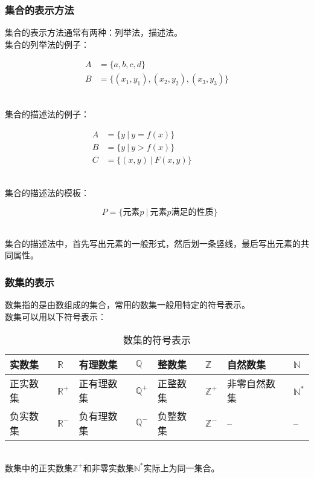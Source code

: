 \documentclass[UTF8]{ctexart}
\begin{document}
\subsubsection{集合的表示方法}
    集合的表示方法通常有两种：列举法，描述法。\\[3mm]
    集合的列举法的例子：
    \begin{large}
        \begin{align*}
            A&=\big\{ a,b,c,d\big\}\\[5mm]
            B&=\big\{ (x_1,y_1),(x_2,y_2),(x_3,y_3) \big\}
        \end{align*}
    \end{large}\\
    集合的描述法的例子：
    \begin{large}
        \begin{align*}
            A&=\big\{ y~|~y=f(x)\big\}\\[5mm]
            B&=\big\{ y~|~y>f(x)\big\}\\[5mm]
            C&=\big\{ (x,y)~|~F(x,y)\big\}~~~~~~~~~~~~~~~~
        \end{align*}
    \end{large}\\
    集合的描述法的模板：
    \begin{large}
        \begin{equation*}
            ~~~P=\big\{\text{元素}p~|~\text{元素}p\text{满足的性质}\big\}
        \end{equation*}
    \end{large}\\
    集合的描述法中，首先写出元素的一般形式，然后划一条竖线，最后写出元素的共同属性。

\newpage

\subsubsection{数集的表示}
    数集指的是由数组成的集合，常用的数集一般用特定的符号表示。\\[3mm]
    数集可以用以下符号表示：\vspace{5pt}
    \begin{table}[h]
        \begin{center}
            \begin{tabular}{p{45pt}|p{20pt}|p{55pt}|p{20pt}|p{45pt}|p{20pt}|p{65pt}|p{20pt}}
                \hline
                实数集&$\mathbb{R}$&有理数集&$\mathbb{Q}$&整数集&$\mathbb{Z}$&自然数集&$\mathbb{N}$\\ \hline
                正实数集&$\mathbb{R^+}$&正有理数集&$\mathbb{Q^+}$&正整数集&$\mathbb{Z^+}$&非零自然数集&$\mathbb{N^*}$\\ \hline
                负实数集&$\mathbb{R^-}$&负有理数集&$\mathbb{Q^-}$&负整数集&$\mathbb{Z^-}$&--&--\\ \hline
            \end{tabular}
            \caption{数集的符号表示}
        \end{center}
    \end{table}\\
    数集中的正实数集$\mathbb{Z^+}$和非零实数集$\mathbb{N^*}$实际上为同一集合。\vspace{8pt}
\end{document}
